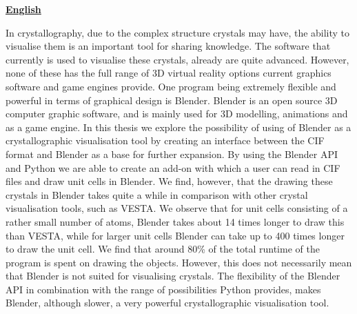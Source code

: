 \newpage
\textbf{\underline{English}}
\par
In crystallography, due to the complex structure crystals may have, the ability to visualise them is an important tool for sharing knowledge. The software that currently is used to visualise these crystals, already are quite advanced. However, none of these has the full range of 3D virtual reality options current graphics software and game engines provide. One program being extremely flexible and powerful in terms of graphical design is Blender. Blender is an open source 3D computer graphic software, and is mainly used for 3D modelling, animations and as a game engine. In this thesis we explore the possibility of using of Blender as a crystallographic visualisation tool by creating an interface between the CIF format and Blender as a base for further expansion. By using the Blender API and Python we are able to create an add-on with which a user can read in CIF files and draw unit cells in Blender. We find, however, that the drawing these crystals in Blender takes quite a while in comparison with other crystal visualisation tools, such as VESTA. We observe that for unit cells consisting of a rather small number of atoms, Blender takes about 14 times longer to draw this than VESTA, while for larger unit cells Blender can take up to 400 times longer to draw the unit cell. We find that around 80\% of the total runtime of the program is spent on drawing the objects. However, this does not necessarily mean that Blender is not suited for visualising crystals. The flexibility of the Blender API in combination with the range of possibilities Python provides, makes Blender, although slower, a very powerful crystallographic visualisation tool.                